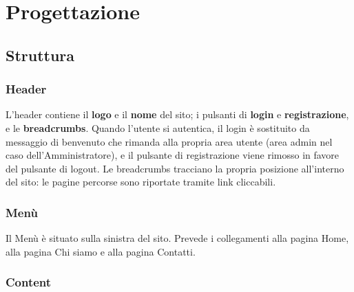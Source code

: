 \documentclass[12pt,a4paper,headings=optiontohead]{article}
\begin{document}
	
	
	\section{Progettazione}
	
	\subsection{Struttura}
	
	
	\subsubsection{Header}
	
	L'header contiene il \textbf{logo} e il \textbf{nome} del sito; i pulsanti di \textbf{login} e \textbf{registrazione}, e le \textbf{breadcrumbs}. 
	Quando l'utente si autentica, il login è sostituito da messaggio di benvenuto che rimanda alla propria area utente (area admin nel caso dell'Amministratore), e il pulsante di registrazione viene rimosso in favore del pulsante di logout.
	Le breadcrumbs tracciano la propria posizione all'interno del sito: le pagine percorse sono riportate tramite link cliccabili. 
		
	\subsubsection{Menù}
	
	Il Menù è situato sulla sinistra del sito. Prevede i collegamenti alla pagina Home, alla pagina Chi siamo e alla pagina Contatti.
	
	\subsubsection{Content}
	
\end{document}
